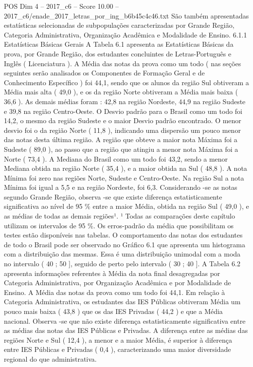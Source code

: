 \begin{textsample}{POS Dim 4 – 2017\_c6 – Score 10.00 – 2017\_c6/enade\_2017\_letras\_por\_ing\_b6b45c4c46.txt}
São também apresentadas estatísticas selecionadas de subpopulações caracterizadas por Grande Região, Categoria Administrativa, Organização Acadêmica e Modalidade de Ensino. 6.1.1 Estatísticas Básicas Gerais A Tabela 6.1 apresenta as Estatísticas Básicas da prova, por Grande Região, dos estudantes concluintes de Letras-Português e Inglês ( Licenciatura ).
A Média das notas da prova como um todo ( nas seções seguintes serão analisados os Componentes de Formação Geral e de Conhecimento Específico ) foi 44,1, sendo que os alunos da região Sul obtiveram a Média mais alta ( 49,0 ), e os da região Norte obtiveram a Média mais baixa ( 36,6 ).
As demais médias foram : 42,8 na região Nordeste, 44,9 na região Sudeste e 39,8 na região Centro-Oeste.
O Desvio padrão para o Brasil como um todo foi 14,2, o mesmo da região Sudeste e o maior Desvio padrão encontrado.
O menor desvio foi o da região Norte ( 11,8 ), indicando uma dispersão um pouco menor das notas desta última região.
A região que obteve a maior nota Máxima foi a Sudeste ( 89,0 ), ao passo que a região que atingiu a menor nota Máxima foi a Norte ( 73,4 ).
A Mediana do Brasil como um todo foi 43,2, sendo a menor Mediana obtida na região Norte ( 35,4 ), e a maior obtida na Sul ( 48,8 ).
A nota Mínima foi zero nas regiões Norte, Sudeste e Centro-Oeste.
Na região Sul a nota Mínima foi igual a 5,5 e na região Nordeste, foi 6,3.
Considerando -se as notas segundo Grande Região, observa -se que existe diferença estatisticamente significativa ao nível de 95 \% entre a maior Média, obtida na região Sul ( 49,0 ), e as médias de todas as demais regiões¹. ¹ Todas as comparações deste capítulo utilizam os intervalos de 95 \%.
Os erros-padrão da média que possibilitam os testes estão disponíveis nas tabelas.
O comportamento das notas dos estudantes de todo o Brasil pode ser observado no Gráfico 6.1 que apresenta um histograma com a distribuição das mesmas.
Essa é uma distribuição unimodal com a moda no intervalo ( 40 ; 50 ], seguido de perto pelo intervalo ( 30 ; 40 ].
A Tabela 6.2 apresenta informações referentes à Média da nota final desagregadas por Categoria Administrativa, por Organização Acadêmica e por Modalidade de Ensino.
A Média das notas da prova como um todo foi 44,1.
Em relação à Categoria Administrativa, os estudantes das IES Públicas obtiveram Média um pouco mais baixa ( 43,8 ) que os das IES Privadas ( 44,2 ) e que a Média nacional.
Observa -se que não existe diferença estatisticamente significativa entre as médias das notas das IES Públicas e Privadas.
A diferença entre as médias das regiões Norte e Sul ( 12,4 ), a menor e a maior Média, é superior à diferença entre IES Públicas e Privadas ( 0,4 ), caracterizando uma maior diversidade regional do que administrativa.

\end{textsample}
